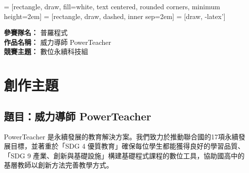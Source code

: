 \documentclass[12pt]{article}
\begin{document}
\setlength{\parskip}{-6pt}
\date{}
\usetikzlibrary{automata, positioning, arrows, shapes, fit}
{}
 = [rectangle, draw, fill=white, 
    text centered, rounded corners, minimum height=2em]
 = [rectangle, draw, dashed, inner sep=2em]
 = [draw, -latex']
\setlength{\parindent}{2em}

\noindent
\textbf{參賽隊名：} 普羅程式 \\
\textbf{作品名稱：} 威力導師 PowerTeacher \\
\textbf{競賽主題：} 數位永續科技組

\section{創作主題}
\subsection{題目：威力導師 PowerTeacher}
\par PowerTeacher 是永續發展的教育解決方案。我們致力於推動聯合國的17項永續發展目標，並著重於「SDG 4 優質教育」確保每位學生都能獲得良好的學習品質、「SDG 9 產業、創新與基礎設施」構建基礎程式課程的數位工具，協助國高中的基層教師以創新方法完善教學方式。
\end{document}
